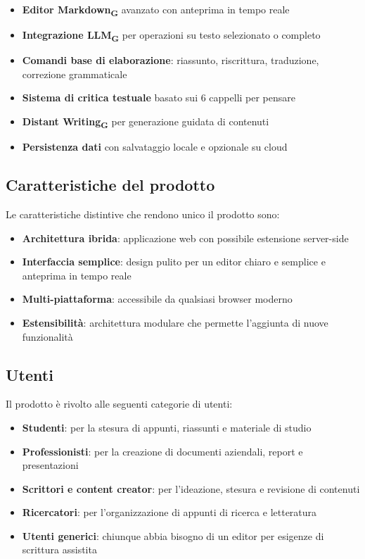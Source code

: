 \documentclass[11pt,a4paper]{article}
\begin{document}
\begin{itemize}
    \item \textbf{Editor Markdown\textsubscript{G}} avanzato con anteprima in tempo reale
    \item \textbf{Integrazione LLM\textsubscript{G}} per operazioni su testo selezionato o completo
    \item \textbf{Comandi base di elaborazione}: riassunto, riscrittura, traduzione, correzione grammaticale
    \item \textbf{Sistema di critica testuale} basato sui 6 cappelli per pensare
    \item \textbf{Distant Writing\textsubscript{G}} per generazione guidata di contenuti
    \item \textbf{Persistenza dati} con salvataggio locale e opzionale su cloud
\end{itemize}

\subsection{Caratteristiche del prodotto}
Le caratteristiche distintive che rendono unico il prodotto sono:

\begin{itemize}
    \item \textbf{Architettura ibrida}: applicazione web con possibile estensione server-side
    \item \textbf{Interfaccia semplice}: design pulito per un editor chiaro e semplice e anteprima in tempo reale
    \item \textbf{Multi-piattaforma}: accessibile da qualsiasi browser moderno
    \item \textbf{Estensibilità}: architettura modulare che permette l'aggiunta di nuove funzionalità
    
\end{itemize}

\subsection{Utenti}
Il prodotto è rivolto alle seguenti categorie di utenti:

\begin{itemize}
    \item \textbf{Studenti}: per la stesura di appunti, riassunti e materiale di studio
    \item \textbf{Professionisti}: per la creazione di documenti aziendali, report e presentazioni
    \item \textbf{Scrittori e content creator}: per l'ideazione, stesura e revisione di contenuti
    \item \textbf{Ricercatori}: per l'organizzazione di appunti di ricerca e letteratura
    \item \textbf{Utenti generici}: chiunque abbia bisogno di un editor per esigenze di scrittura assistita
\end{itemize}
\end{document}
